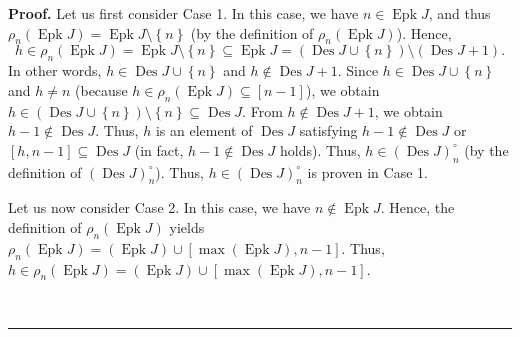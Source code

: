 \documentclass[numbers=enddot,12pt,final,onecolumn,notitlepage]{scrartcl}%
\theoremstyle{definition}
\newenvironment{proof}[1][Proof]{\noindent\textbf{#1.} }{\ \rule{0.5em}{0.5em}}
\newenvironment{verlong}{}{}
\begin{document}
\begin{verlong}
\begin{proof}
Let us first consider Case 1. In this case, we have $n\in\operatorname{Epk}
J$, and thus $\rho_{n}\left(  \operatorname{Epk}J\right)
=\operatorname{Epk}J\setminus\left\{  n\right\}  $ (by the definition of
$\rho_{n}\left(  \operatorname{Epk}J\right)  $). Hence,
\[
h\in\rho_{n}\left(  \operatorname{Epk}J\right)  =\operatorname{Epk}
J\setminus\left\{  n\right\}  \subseteq\operatorname{Epk}J=\left(
\operatorname{Des}J\cup\left\{  n\right\}  \right)  \setminus\left(
\operatorname{Des}J+1\right)  .
\]
In other words, $h\in\operatorname{Des}J\cup\left\{  n\right\}  $ and
$h\notin\operatorname{Des}J+1$. Since $h\in\operatorname{Des}J\cup\left\{
n\right\}  $ and $h\neq n$ (because $h\in\rho_{n}\left(  \operatorname{Epk}
J\right)  \subseteq\left[  n-1\right]  $), we obtain $h\in\left(
\operatorname{Des}J\cup\left\{  n\right\}  \right)  \setminus\left\{
n\right\}  \subseteq\operatorname{Des}J$. From $h\notin\operatorname{Des}
J+1$, we obtain $h-1\notin\operatorname{Des}J$. Thus, $h$ is an element of
$\operatorname{Des}J$ satisfying $h-1\notin\operatorname{Des}J$ or $\left[
h,n-1\right]  \subseteq\operatorname{Des}J$ (in fact, $h-1\notin%
\operatorname{Des}J$ holds). Thus, $h\in\left(  \operatorname{Des}J\right)
_{n}^{\circ}$ (by the definition of $\left(  \operatorname{Des}J\right)
_{n}^{\circ}$). Thus, $h\in\left(  \operatorname{Des}J\right)  _{n}^{\circ}$
is proven in Case 1.

Let us now consider Case 2. In this case, we have $n\notin\operatorname{Epk}
J$. Hence, the definition of $\rho_{n}\left(  \operatorname{Epk}J\right)  $
yields $\rho_{n}\left(  \operatorname{Epk}J\right)  =\left(
\operatorname{Epk}J\right)  \cup\left[  \max\left(  \operatorname{Epk}
J\right)  ,n-1\right]  $. Thus, $h\in\rho_{n}\left(  \operatorname{Epk}
J\right)  =\left(  \operatorname{Epk}J\right)  \cup\left[  \max\left(
\operatorname{Epk}J\right)  ,n-1\right]  $.


\end{proof}
\end{verlong}
\end{document}
